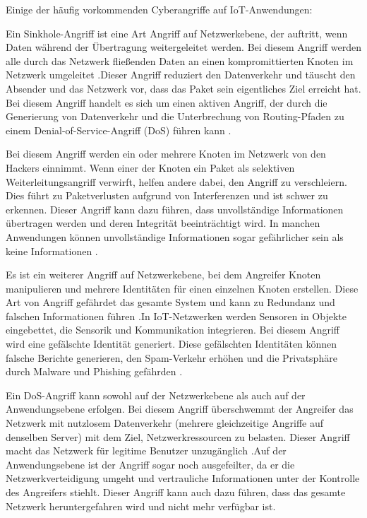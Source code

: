 Einige der häufig vorkommenden Cyberangriffe auf IoT-Anwendungen:

Ein Sinkhole-Angriff ist eine Art Angriff auf Netzwerkebene, der auftritt, wenn Daten während der Übertragung weitergeleitet werden. Bei diesem Angriff werden alle durch das Netzwerk fließenden Daten an einen kompromittierten Knoten im Netzwerk umgeleitet \cite{7001385} .Dieser Angriff reduziert den Datenverkehr und täuscht den Absender und das Netzwerk vor, dass das Paket sein eigentliches Ziel erreicht hat. Bei diesem Angriff handelt es sich um einen aktiven Angriff, der durch die Generierung von Datenverkehr und die Unterbrechung von Routing-Pfaden zu einem Denial-of-Service-Angriff (DoS) führen kann \cite{stephen2017intrusion} .

Bei diesem Angriff werden ein oder mehrere Knoten im Netzwerk von den Hackers einnimmt. Wenn einer der Knoten ein Paket als selektiven Weiterleitungsangriff verwirft, helfen andere dabei, den Angriff zu verschleiern. Dies führt zu Paketverlusten aufgrund von Interferenzen und ist schwer zu erkennen. Dieser Angriff kann dazu führen, dass unvollständige Informationen übertragen werden und deren Integrität beeinträchtigt wird. In manchen Anwendungen können unvollständige Informationen sogar gefährlicher sein als keine Informationen \cite{s16010118} .

Es ist ein weiterer Angriff auf Netzwerkebene, bei dem Angreifer Knoten manipulieren und mehrere Identitäten für einen einzelnen Knoten erstellen. Diese Art von Angriff gefährdet das gesamte System und kann zu Redundanz und falschen Informationen führen \cite{pawar2016sybil} .In IoT-Netzwerken werden Sensoren in Objekte eingebettet, die Sensorik und Kommunikation integrieren. Bei diesem Angriff wird eine gefälschte Identität generiert. Diese gefälschten Identitäten können falsche Berichte generieren, den Spam-Verkehr erhöhen und die Privatsphäre durch Malware und Phishing gefährden \cite{alqassem2014privacy} .

Ein DoS-Angriff kann sowohl auf der Netzwerkebene als auch auf der Anwendungsebene erfolgen. Bei diesem Angriff überschwemmt der Angreifer das Netzwerk mit nutzlosem Datenverkehr (mehrere gleichzeitige Angriffe auf denselben Server) mit dem Ziel, Netzwerkressourcen zu belasten. Dieser Angriff macht das Netzwerk für legitime Benutzer unzugänglich \cite{kozlov2012security} .Auf der Anwendungsebene ist der Angriff sogar noch ausgefeilter, da er die Netzwerkverteidigung umgeht und vertrauliche Informationen unter der Kontrolle des Angreifers stiehlt. Dieser Angriff kann auch dazu führen, dass das gesamte Netzwerk heruntergefahren wird und nicht mehr verfügbar ist\cite{pawar2016sybil}.

